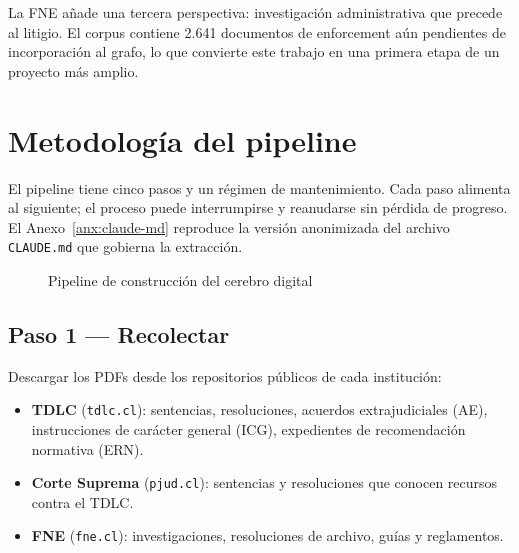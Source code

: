 \documentclass[12pt,a4paper]{article}
\begin{document}
La FNE añade una tercera perspectiva: investigación administrativa que precede
al litigio. El corpus contiene 2.641 documentos de enforcement aún pendientes de
incorporación al grafo, lo que convierte este trabajo en una primera etapa de
un proyecto más amplio.

\section{Metodología del pipeline}

El pipeline tiene cinco pasos y un régimen de mantenimiento. Cada paso alimenta
al siguiente; el proceso puede interrumpirse y reanudarse sin pérdida de
progreso.\autocite{schrepel2026brain} El Anexo~\ref{anx:claude-md} reproduce la
versión anonimizada del archivo \texttt{CLAUDE.md} que gobierna la extracción.

\begin{figure}[h!]
  \centering
  \caption{Pipeline de construcción del cerebro digital}
  \label{fig:pipeline}
\end{figure}

\subsection{Paso 1 — Recolectar}

Descargar los PDFs desde los repositorios públicos de cada institución:

\begin{itemize}
  \item \textbf{TDLC} (\texttt{tdlc.cl}): sentencias, resoluciones, acuerdos
    extrajudiciales (AE), instrucciones de carácter general (ICG), expedientes
    de recomendación normativa (ERN).
  \item \textbf{Corte Suprema} (\texttt{pjud.cl}): sentencias y resoluciones que
    conocen recursos contra el TDLC.
  \item \textbf{FNE} (\texttt{fne.cl}): investigaciones, resoluciones de archivo,
    guías y reglamentos.
\end{itemize}
\end{document}
